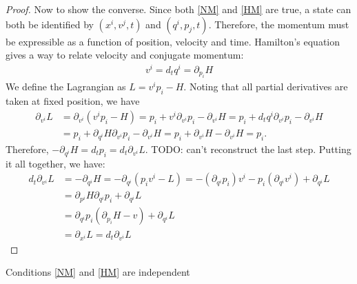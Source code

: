 \documentclass{techbrief}
\begin{document}
\begin{proof}
		Now to show the converse. Since both \ref{NM} and \ref{HM} are true, a state can both be identified by $(x^{i},v^{j},t)$ and $(q^{i},p_{j},t)$. Therefore, the momentum must be expressible as a function of position, velocity and time. Hamilton's equation gives a way to relate velocity and conjugate momentum:
		\begin{equation}
			\begin{aligned}
				v^{i} = d_{t}q^{i} = \partial_{p_{i}}H
			\end{aligned}
		\end{equation}
		We define the Lagrangian as $L = v^i p_i -H$. Noting that all partial derivatives are taken at fixed position, we have
		\begin{equation}
			\begin{aligned}
				\partial_{v^i} L &= \partial_{v^i} (v^i p_i -H) = p_i + v^i \partial_{v^i} p_i - \partial_{v^i} H = p_i + d_t q^i \partial_{v^i} p_i - \partial_{v^i} H \\
				&= p_i + \partial_{q^i} H \partial_{v^i} p_i - \partial_{v^i} H =  p_i + \partial_{v^i} H - \partial_{v^i} H = p_i.
			\end{aligned}
		\end{equation}
		Therefore, $-\partial_{q^{i}}H = d_{t}p_{i} = d_{t}\partial_{v^{i}}L$. TODO: can't reconstruct the last step. Putting it all together, we have:
		\begin{equation}
			\begin{aligned}
				d_{t}\partial_{v^{i}}L &= -\partial_{q^{i}}H = - \partial_{q^{i}}(p_i v^i - L) = - (\partial_{q^{i}}p_{i}) v^{i} - p_{i}(\partial_{q^{i}}v^{i}) + \partial_{q^{i}}L \\
				&=  \partial_{p^{i}}H\partial_{q^{i}}p_{i} + \partial_{q^{i}}L \\
				&= \partial_{q^{i}}p_{i}(\partial_{p_{i}}H - v) + \partial_{q^{i}}L \\
				&= \partial_{x^{i}}L = d_{t}\partial_{v^{i}}L
			\end{aligned}
		\end{equation}
	\end{proof}
	\begin{thrm}
		Conditions \ref{NM} and \ref{HM} are independent
	\end{thrm}
\end{document}
